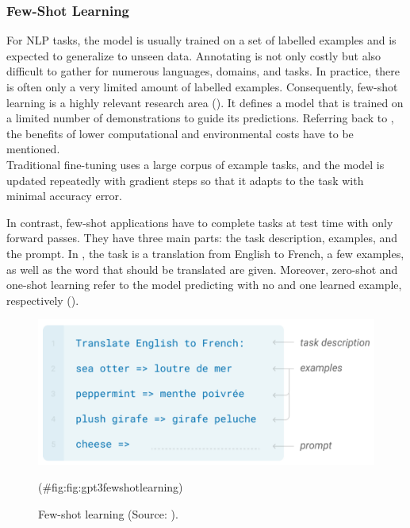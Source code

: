 \documentclass[
]{krantz}
\begin{document}
\hypertarget{few-shot-learning}{%
\subsubsection{Few-Shot Learning}\label{few-shot-learning}}

For NLP tasks, the model is usually trained on a set of labelled
examples and is expected to generalize to unseen data. Annotating is not
only costly but also difficult to gather for numerous languages,
domains, and tasks. In practice, there is often only a very limited
amount of labelled examples. Consequently, few-shot learning is a highly
relevant research area (\citep{Schick2020}). It defines a model that is
trained on a limited number of demonstrations to guide its predictions.
Referring back to , the benefits of lower computational and
environmental costs have to be mentioned.\\
Traditional fine-tuning uses a large corpus of example tasks, and the
model is updated repeatedly with gradient steps so that it adapts to the
task with minimal accuracy error.

In contrast, few-shot applications have to complete tasks at test time
with only forward passes. They have three main parts: the task
description, examples, and the prompt. In , the task is a translation
from English to French, a few examples, as well as the word that should
be translated are given. Moreover, zero-shot and one-shot learning refer
to the model predicting with no and one learned example, respectively
(\citep{brown2020language}).

\begin{figure}

{\centering \includegraphics[width=0.5\linewidth]{./figures/01-01-nlp/gpt3_few-shot-learning} 

}

\caption{Few-shot learning (Source: \citet{brown2020language}).}(\#fig:fig:gpt3fewshotlearning)
\end{figure}
\end{document}
